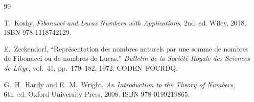 \begin{thebibliography}{99}

T.~Koshy,
\emph{Fibonacci and Lucas Numbers with Applications}, 2nd~ed.
Wiley, 2018.
ISBN 978-1118742129.

E.~Zeckendorf,
``Repr\'esentation des nombres naturels par une somme de nombres de
Fibonacci ou de nombres de Lucas,''
\emph{Bulletin de la Soci\'et\'e Royale des Sciences de Li\`ege},
vol.~41, pp.~179--182, 1972.
CODEN~FOCRDQ.

G.~H.~Hardy and E.~M.~Wright,
\emph{An Introduction to the Theory of Numbers}, 6th~ed.
Oxford University Press, 2008.
ISBN 978-0199219865.

\end{thebibliography}
